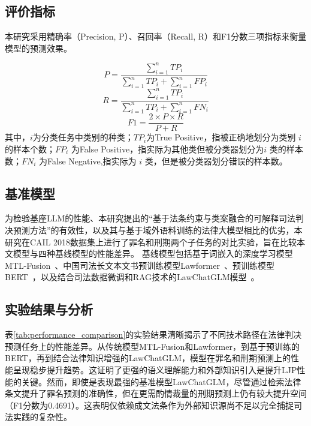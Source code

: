 \subsection{\heiti 评价指标}
本研究采用精确率（Precision, P）、召回率（Recall, R）和F1分数三项指标来衡量模型的预测效果。

\begin{equation}
	P=\frac{\sum_{i=1}^{n}TP_{i}}{\sum_{i=1}^{n}TP_{i}+\sum_{i=1}^{n}FP_{i}}
\end{equation}
\begin{equation}
	R=\frac{\sum_{i=1}^{n}TP_{i}}{\sum_{i=1}^{n}TP_{i}+\sum_{i=1}^{n}FN_{i}}
	\label{eq:recall}
\end{equation}
\begin{equation}
	F1=\frac{2\times P\times R}{P+R}
\end{equation}
其中，$i$为分类任务中类别的种类；$TP_i$为True Positive，指被正确地划分为类别 $i$ 的样本个数；$FP_i$ 为False Positive，指实际为其他类但被分类器划分为$i$ 类的样本数；$FN_i$ 为False Negative,指实际为 $i$ 类，但是被分类器划分错误的样本数。

\subsection{\heiti 基准模型}
为检验基座LLM的性能、本研究提出的“基于法条约束与类案融合的可解释司法判决预测方法”的有效性，以及其与基于域外语料训练的法律大模型相比的优劣，本研究在CAIL 2018数据集上进行了罪名和刑期两个子任务的对比实验，旨在比较本文模型与四种基线模型的性能差异。
基线模型包括基于词嵌入的深度学习模型MTL-Fusion~\cite{zhuopeng-etal-2020-multi}、中国司法长文本文书预训练模型Lawformer~\cite{xiao2021lawformer}、预训练模型BERT~\cite{fan2022multi}，以及结合司法数据微调和RAG技术的LawChatGLM模型~\cite{JSJA202505027}。


\subsection{\heiti 实验结果与分析}

表\ref{tab:performance_comparison}的实验结果清晰揭示了不同技术路径在法律判决预测任务上的性能差异。从传统模型MTL-Fusion和Lawformer，到基于预训练的BERT，再到结合法律知识增强的LawChatGLM，模型在罪名和刑期预测上的性能呈现稳步提升趋势。这证明了更强的语义理解能力和外部知识引入是提升LJP性能的关键。然而，即使是表现最强的基准模型LawChatGLM，尽管通过检索法律条文提升了罪名预测的准确性，但在更需酌情裁量的刑期预测上仍有较大提升空间（F1分数为0.4691）。这表明仅依赖成文法条作为外部知识源尚不足以完全捕捉司法实践的复杂性。

